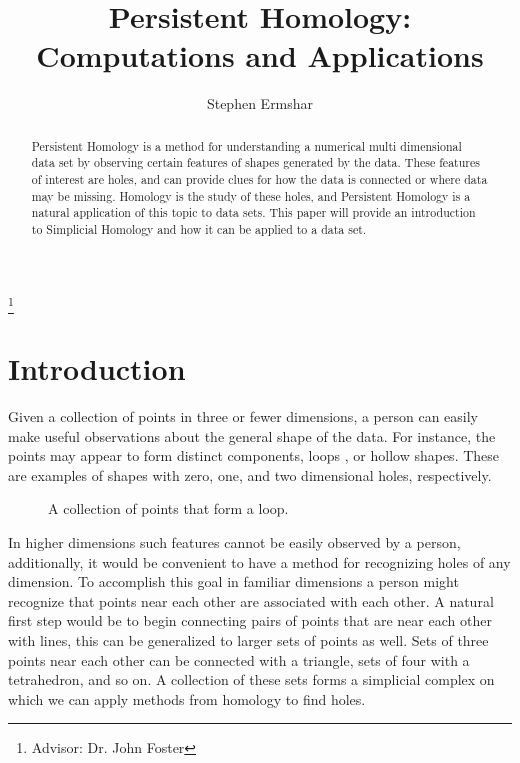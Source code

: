 

\title[Persistent Homology]{Persistent Homology: Computations and Applications}
\author{Stephen Ermshar}
\address{Walla Walla University}
\thanks{Advisor: Dr. John Foster}

\date{} %



\begin{abstract}
    Persistent Homology is a method for understanding a numerical multi dimensional data set by observing certain features of shapes generated by the data.
    These features of interest are holes, and can provide clues for how the data is connected or where data may be missing.
    Homology is the study of these holes, and Persistent Homology is a natural application of this topic to data sets.
    This paper will provide an introduction to Simplicial Homology and how it can be applied to a data set.
\end{abstract}
\maketitle

\section{Introduction}

Given a collection of points in three or fewer dimensions, a person can easily make useful observations about the general shape of the data.
For instance, the points may appear to form distinct components, loops , or hollow shapes.
These are examples of shapes with zero, one, and two dimensional holes, respectively.

\begin{figure}
    
    \caption{A collection of points that form a loop.}
    \label{fig:annulus}
\end{figure}

In higher dimensions such features cannot be easily observed by a person, additionally, it would be convenient to have a method for recognizing holes of any dimension.
To accomplish this goal in familiar dimensions a person might recognize that points near each other are associated with each other.
A natural first step would be to begin connecting pairs of points that are near each other with lines, this can be generalized to larger sets of points as well.
Sets of three points near each other can be connected with a triangle, sets of four with a tetrahedron, and so on. A collection of these sets forms a simplicial complex on which we can apply methods from homology to find holes.

